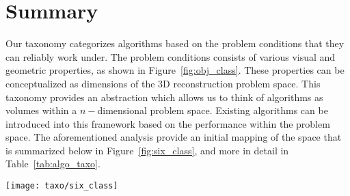 \section{Summary}
Our taxonomy categorizes algorithms based on the problem conditions that they can reliably work under. The problem conditions consists of various visual and geometric properties, as shown in Figure~\ref{fig:obj_class}. These properties can be conceptualized as dimensions of the 3D reconstruction problem space. This taxonomy provides an abstraction which allows us to think of algorithms as volumes within a $n-$dimensional problem space. Existing algorithms can be introduced into this framework based on the performance within the problem space. The aforementioned analysis provide an initial mapping of the space that is summarized below in Figure~\ref{fig:six_class}, and more in detail in Table~\ref{tab:algo_taxo}.
\begin{figure*}[!htbp]
\centering
\texttt{[image: taxo/six\_class]}
\caption{Six classes of objects of interest, and the algorithms that could work reliably for these classes.}
\label{fig:six_class}
\end{figure*}


